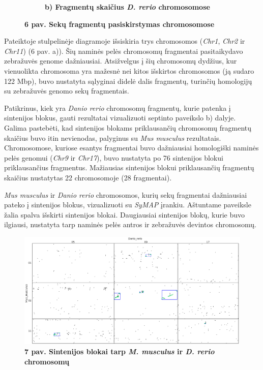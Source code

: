 \documentclass[12pt]{article}
\begin{document}
\begin{figure}[htb]
\begin{subfigure}[b]{0.45\textwidth}
        \caption*{\centering\small\textbf{b) Fragmentų skaičius \emph{D. rerio}
                                          chromosomose}}
    \end{subfigure}
    \caption*{\small\textbf{6 pav. Sekų fragmentų pasiskirstymas chromosomose}}
    \label{fig:6}
\end{figure}

Pateiktoje stulpelinėje diagramoje išsiskiria trys chromosomos (\emph{Chr1},
\emph{Chr2} ir \emph{Chr11}) (6 pav. a)). Šių naminės pelės chromosomų
fragmentai pasitaikydavo zebražuvės genome dažniausiai. Atsižvelgus į šių
chromosomų dydžius, kur vienuolikta chromosoma yra mažesnė nei kitos išskirtos
chromosomos (ją sudaro 122 Mbp\cite{MGI}), buvo nustatyta sąlyginai didelė dalis
fragmentų, turinčių homologijų su zebražuvės genomo sekų fragmentais.

Patikrinus, kiek yra \emph{Danio rerio} chromosomų fragmentų, kurie patenka į
sintenijos blokus, gauti rezultatai vizualizuoti septinto paveikslo b) dalyje.
Galima pastebėti, kad sintenijos blokams priklausančių chromosomų fragmentų
skaičius buvo itin nevienodas, palyginus su \emph{Mus musculus} rezultatais.
Chromosomose, kuriose esantys fragmentai buvo dažniausiai homologiški naminės
pelės genomui (\emph{Chr9} ir \emph{Chr17}), buvo nustatyta po 76 sintenijos
blokui priklausančius fragmentus. Mažiausias sintenijos blokui priklausančių
fragmentų skaičius nustatytas 22 chromosomoje (28 fragmentai).

\emph{Mus musculus} ir \emph{Danio rerio} chromosomos, kurių sekų fragmentai
dažniausiai pateko į sintenijos blokus, vizualizuoti su \emph{SyMAP} įrankiu.
Aštuntame paveiksle žalia spalva išskirti sintenijos blokai. Daugiausiai
sintenijos blokų, kurie buvo ilgiausi, nustatyta tarp naminės pelės antros
ir zebražuvės devintos chromosomų.

\newpage

\begin{figure}[htb]
    \begin{center}
        \includegraphics[width=0.8\linewidth]{../Figures/Blocks_Chr2_9.png}
        \vspace{-1\baselineskip}
        \caption*{\small\textbf{7 pav. Sintenijos blokai tarp \emph{M. musculus}
                                ir \emph{D. rerio} chromosomų}}
        \label{fig:7}
    \end{center}
\end{figure}
\end{document}
